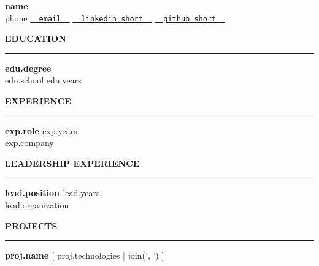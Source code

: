 \documentclass[11pt,a4paper]{article}
\newcommand{\sectionrule}{\vspace{2pt}\noindent\hrule\vspace{8pt}}
\begin{document}
\pagestyle{empty}

\begin{center}
    {\LARGE \textbf{ {{ name }} }} \\[6pt]
    {{ phone }} \textbar{} 
    \href{mailto:{{ email }}}{\texttt{ {{ email }} }} \textbar{} 
    \href{ {{ linkedin }}}{\texttt{ {{ linkedin_short }} }} \textbar{} 
    \href{ {{ github }}}{\texttt{ {{ github_short }} }}
\end{center}

\vspace{-15pt}

\noindent\textbf{EDUCATION}\\[2pt]
\sectionrule
{%
\textbf{ {{ edu.degree }} } \\
{{ edu.school }} \hfill {{ edu.years }} \\[2pt]
{%

\noindent\textbf{EXPERIENCE}\\[2pt]
\sectionrule
{%
\textbf{ {{ exp.role }} } \hfill {{ exp.years }} \\
{{ exp.company }}
{%
{%
{%

{%
\noindent\textbf{LEADERSHIP EXPERIENCE}\\[2pt]
\sectionrule
{%
\textbf{ {{ lead.position }} } \hfill {{ lead.years }} \\
{{ lead.organization }}
{%
{%
{%
{%

{%
\noindent\textbf{PROJECTS}\\[2pt]
\sectionrule
{%
\textbf{ {{ proj.name }} } [{{ proj.technologies | join(', ') }}]
{%
{%
{%
{%

}}}}}}}}}}}}}}}}}}
\end{document}
